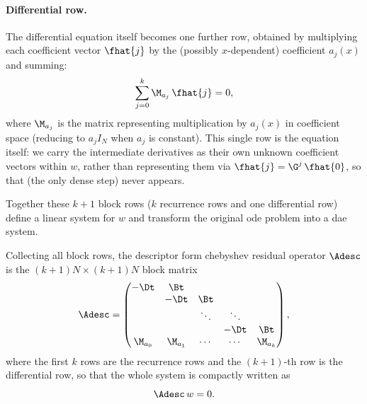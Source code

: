 \paragraph{Differential row.} The differential equation itself becomes one
further row, obtained by multiplying each coefficient vector $\fhat{j}$ by
the (possibly $x$-dependent) coefficient $a_j(x)$ and summing:
\begin{equation}
  \sum_{j=0}^{k} \M_{a_j}\, \fhat{j} = 0,
  \label{eq:descriptor-ode-row}
\end{equation}
where $\M_{a_j}$ is the matrix representing multiplication by $a_j(x)$ in
coefficient space (reducing to $a_j I_N$ when $a_j$ is constant). This single row is the equation itself: we carry the intermediate derivatives as their own unknown coefficient vectors within $w$, rather than representing them via $\fhat{j} = \G^j\,\fhat{0}$, so that  (the only dense step) never appears.

Together these $k+1$ block rows ($k$ recurrence rows and one
differential row) define a linear system for $w$ and transform the original \gls{ode} problem into a \gls{dae} system.

\begin{definition}
\label{def:descriptor-residual-operator}
Collecting all block rows, the descriptor form chebyshev residual operator
$\Adesc$ is the $(k+1)N \times (k+1)N$ block matrix
\begin{equation}
\Adesc =
\begin{pmatrix}
-\Dt & \Bt &        &        &          \\
          & -\Dt & \Bt &      &          \\
          &          & \ddots & \ddots &          \\
          &          &        & -\Dt & \Bt \\
\M_{a_0}   & \M_{a_1}  & \cdots & \cdots & \M_{a_k}
\end{pmatrix},
\end{equation}
where the first $k$ rows are the recurrence rows and the $(k+1)$-th row is
the differential row, so that the whole system is compactly written as
\begin{equation}
  \Adesc\, w = 0.
\end{equation}
\end{definition}

